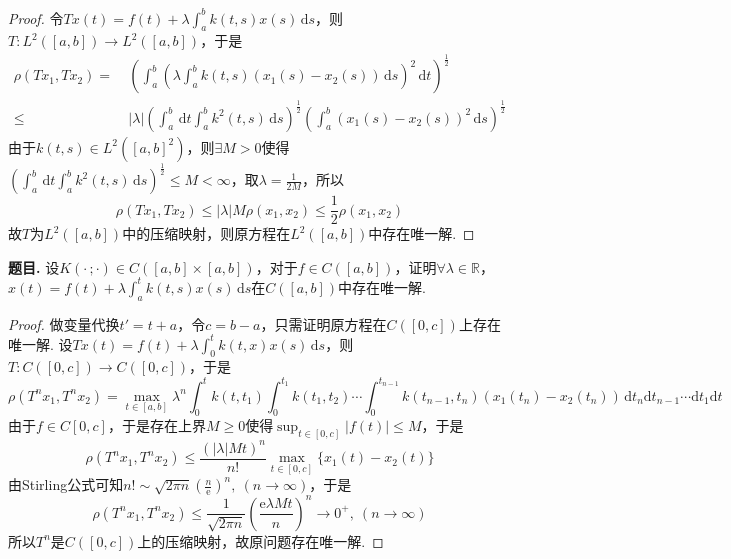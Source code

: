 \documentclass[12pt, a4paper, oneside]{ctexart}
\newcounter{problem}  %
\newenvironment{problem}{\stepcounter{problem}\par\noindent\textbf{题目\arabic{problem}. }}{\smallskip\par}
\let\leq=\leqslant %
\let\geq=\geqslant %
\def\R{\mathbb{R}}          %
\def\d{\mathrm{d}}          %
\def\e{\mathrm{e}}          %
\def\add{\vspace{1ex}}      %
\begin{document}
\begin{proof}
    令$Tx(t) = f(t)+\lambda \int_a^b k(t, s)x(s)\,\d s$，则$T:L^2([a,b])\to L^2([a,b])$，于是 
    \begin{align*}
        \rho(Tx_1,Tx_2)=&\ \left(\int_a^b\left(\lambda\int_a^bk(t,s)(x_1(s)-x_2(s))\,\d s\right)^2\,\d t\right)^{\frac{1}{2}}\\
        \leq&\ |\lambda|\left(\int_a^b\,\d t\int_a^bk^2(t,s)\,\d s\right)^{\frac{1}{2}}\left(\int_a^b(x_1(s)-x_2(s))^2\,\d s\right)^{\frac{1}{2}}
    \end{align*}
    由于$k(t,s)\in L^2([a,b]^2)$，则$\exists M > 0$使得$\left(\int_a^b\,\d t\int_a^bk^2(t,s)\,\d s\right)^{\frac{1}{2}}\leq M < \infty$，取$\lambda = \frac{1}{2M}$，所以
    \begin{equation*}
        \rho(Tx_1,Tx_2)\leq |\lambda|M\rho(x_1,x_2)\leq \frac{1}{2}\rho(x_1,x_2)
    \end{equation*}
    故$T$为$L^2([a,b])$中的压缩映射，则原方程在$L^2([a,b])$中存在唯一解.
\end{proof}
\begin{problem}
    设$K(\cdot\, ;\cdot )\in C([a,b]\times [a,b])$，对于$f\in C([a,b])$，证明$\forall \lambda \in \R$，\add\\
    $x(t)= f(t)+\lambda\int_a^t k(t,s)x(s)\,\d s$在$C([a,b])$中存在唯一解.
\end{problem}
\begin{proof}
    做变量代换$t'=t+a$，令$c=b-a$，只需证明原方程在$C([0,c])$上存在唯一解. 设$Tx(t) = f(t)+\lambda \int_0^t k(t,x)x(s)\,\d s$，则$T:C([0,c])\to C([0,c])$，于是
    \begin{equation*}
        \rho(T^nx_1,T^nx_2) = \max_{t\in[a,b]}\lambda^n\int_0^tk(t,t_1)\int_0^{t_1}k(t_1,t_2)\cdots\int_0^{t_{n-1}}k(t_{n-1}, t_n)(x_1(t_n) - x_2(t_n))\,\d t_n\d t_{n-1}\cdots\d t_1\d t
    \end{equation*}
    由于$f\in C[0,c]$，于是存在上界$M\geq 0$使得$\sup_{t\in[0,c]}|f(t)|\leq M$，于是
    \begin{equation*}
        \rho(T^nx_1,T^nx_2)\leq \frac{(|\lambda|Mt)^n}{n!}\max_{t\in[0,c]}\{x_1(t)-x_2(t)\}
    \end{equation*}
    由Stirling公式可知$n!\sim \sqrt{2\pi n}\left(\frac{n}{\e}\right)^n,\ (n\to\infty)$，于是
    \begin{equation*}
        \rho(T^nx_1,T^nx_2)\leq \frac{1}{\sqrt{2\pi n}}\left(\frac{\e \lambda M t}{n}\right)^n\to 0^+,\ (n\to\infty)
    \end{equation*}
    所以$T^n$是$C([0,c])$上的压缩映射，故原问题存在唯一解.
\end{proof}
\end{document}
